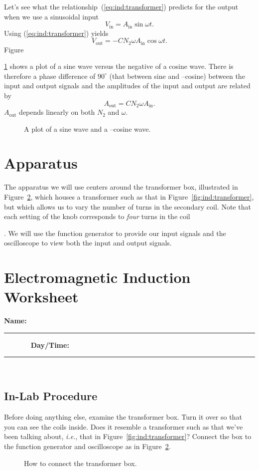 Let's see what the relationship~(\ref{eq:ind:transformer}) predicts for the 
output when we use a sinusoidal input
$$
V_{\mbox{in}} = A_{\mbox{in}} \sin\omega t.
$$
Using (\ref{eq:ind:transformer}) yields
$$
V_{\mbox{out}}= -C N_2 \omega A_{\mbox{in}} \cos\omega t.
$$
Figure~{\ref{fig:ind:sinusoid} shows a plot of a sine wave versus the negative
of a cosine wave.
There is therefore a phase difference of $90^\circ$ (that between sine and 
--cosine) between the input and output signals and the amplitudes of the input 
and output are related by 
$$ A_{\mbox{out}} = C N_2 \omega A_{\mbox{in}}. $$
$A_{\mbox{out}}$ depends linearly on both $N_2$ and $\omega$.
\begin{figure}[htb]
\centerline{\epsfxsize=10cm }
\caption{A plot of a sine wave and a --cosine wave.}
\label{fig:ind:sinusoid}
\end{figure}

\section{Apparatus}

The apparatus we will use centers around the transformer box, illustrated in
Figure~\ref{fig:ind:connect}, which houses a transformer such as that in 
Figure~\ref{fig:ind:transformer}, but which allows us to vary the number of 
turns in the secondary coil. 
Note that each setting of the knob corresponds to
{\it four} turns in the coil}. We will use the function generator to provide 
our input signals and the oscilloscope to view both the input and output 
signals.


\vfill
\pagebreak

\renewcommand{\thesection}{\thechapter.W}

\section{Electromagnetic Induction Worksheet}

{\bf \Large Name:}~ \rule{5cm}{.1mm}~~~~~~~
{\bf \Large Day/Time:}~\rule{3cm}{.1mm}\\

\subsection{In-Lab Procedure}
\label{sec:ind:proc}

Before doing anything else, examine the transformer box.  Turn it over so that
you can see the coils inside.  Does it resemble a transformer such as that 
we've been talking about, {\it i.e.}, that in 
Figure~\ref{fig:ind:transformer}?  Connect the box to the function generator
and oscilloscope as in Figure~\ref{fig:ind:connect}.
\begin{figure}[htb]
\centerline{\epsfxsize=12cm }
\caption{How to connect the transformer box.}
\label{fig:ind:connect}
\end{figure}

